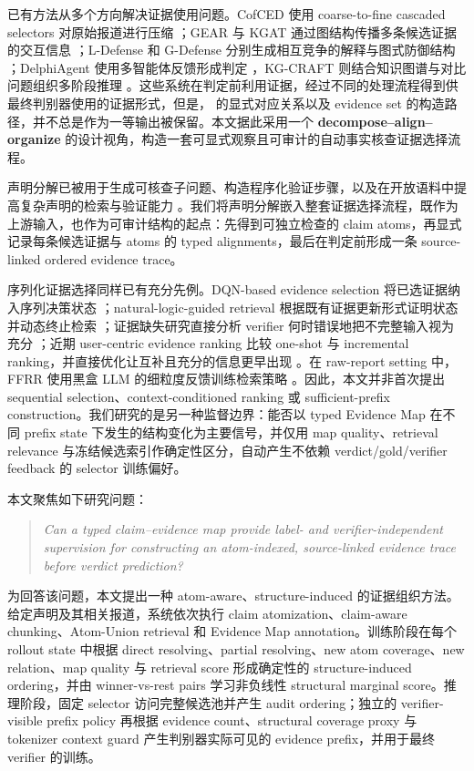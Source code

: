 \documentclass[letterpaper]{article}
\begin{document}
已有方法从多个方向解决证据使用问题。CofCED 使用 coarse-to-fine cascaded selectors 对原始报道进行压缩 \citep{Yang2022CofCED}；GEAR 与 KGAT 通过图结构传播多条候选证据的交互信息 \citep{Zhou2019GEAR,Liu2019KGAT}；L-Defense 和 G-Defense 分别生成相互竞争的解释与图式防御结构 \citep{Wang2024LDefense,Wang2026GDefense}；DelphiAgent 使用多智能体反馈形成判定 \citep{Xiong2025DelphiAgent}，KG-CRAFT 则结合知识图谱与对比问题组织多阶段推理 \citep{Lourenco2026KGCRAFT}。这些系统在判定前利用证据，经过不同的处理流程得到供最终判别器使用的证据形式，但是，\texttt{} 的显式对应关系以及 evidence set 的构造路径，并不总是作为一等输出被保留。本文据此采用一个 \textbf{decompose--align--organize} 的设计视角，构造一套可显式观察且可审计的自动事实核查证据选择流程。

声明分解已被用于生成可核查子问题、构造程序化验证步骤，以及在开放语料中提高复杂声明的检索与验证能力 \citep{Chen2022ClaimDecomp,Pan2023ProgramFC,Chen2023WildEvidence}。我们将声明分解嵌入整套证据选择流程，既作为上游输入，也作为可审计结构的起点：先得到可独立检查的 claim atoms，再显式记录每条候选证据与 atoms 的 typed alignments，最后在判定前形成一条 source-linked ordered evidence trace。

序列化证据选择同样已有充分先例。DQN-based evidence selection 将已选证据纳入序列决策状态 \citep{Wan2021DQN}；natural-logic-guided retrieval 根据既有证据更新形式证明状态并动态终止检索 \citep{Aly2022NaturalLogic}；证据缺失研究直接分析 verifier 何时错误地把不完整输入视为充分 \citep{Atanasova2022Insufficient}；近期 user-centric evidence ranking 比较 one-shot 与 incremental ranking，并直接优化让互补且充分的信息更早出现 \citep{Alt2026EvidenceRanking}。在 raw-report setting 中，FFRR 使用黑盒 LLM 的细粒度反馈训练检索策略 \citep{Zhang2024FFRR}。因此，本文并非首次提出 sequential selection、context-conditioned ranking 或 sufficient-prefix construction。我们研究的是另一种监督边界：能否以 typed Evidence Map 在不同 prefix state 下发生的结构变化为主要信号，并仅用 map quality、retrieval relevance 与冻结候选索引作确定性区分，自动产生不依赖 verdict/gold/verifier feedback 的 selector 训练偏好。

本文聚焦如下研究问题：

\begin{quote}
\emph{Can a typed claim--evidence map provide label- and verifier-independent supervision for constructing an atom-indexed, source-linked evidence trace before verdict prediction?}
\end{quote}

为回答该问题，本文提出一种 atom-aware、structure-induced 的证据组织方法。给定声明及其相关报道，系统依次执行 claim atomization、claim-aware chunking、Atom-Union retrieval 和 Evidence Map annotation。训练阶段在每个 rollout state 中根据 direct resolving、partial resolving、new atom coverage、new relation、map quality 与 retrieval score 形成确定性的 structure-induced ordering，并由 winner-vs-rest pairs 学习非负线性 structural marginal score。推理阶段，固定 selector 访问完整候选池并产生 audit ordering；独立的 verifier-visible prefix policy 再根据 evidence count、structural coverage proxy 与 tokenizer context guard 产生判别器实际可见的 evidence prefix，并用于最终 verifier 的训练。
\end{document}
